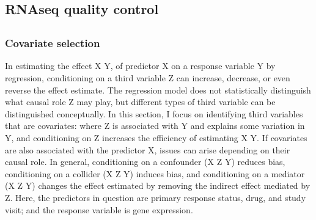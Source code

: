 \begin{outline}
%

\subsection{RNAseq quality control}

\subsection{}

\subsubsection{Covariate selection}

In estimating the effect X \textrightarrow Y, of predictor X on a response variable Y by regression, 
conditioning on a third variable Z can increase, decrease, or even reverse the effect estimate.
The regression model does not statistically distinguish what causal role Z may play,
but different types of third variable can be distinguished conceptually.
In this section, I focus on identifying third variables that are covariates:
where Z is associated with Y and explains some variation in Y,
and conditioning on Z increases the efficiency of estimating X \textrightarrow Y.
If covariates are also associated with the predictor X, issues can arise depending on their causal role.
In general,
conditioning on a confounder (X \textleftarrow Z \textrightarrow Y) reduces bias,
conditioning on a collider (X \textrightarrow Z \textleftarrow Y) induces bias,
and conditioning on a mediator (X \textrightarrow Z \textrightarrow Y) changes the effect estimated by removing the indirect effect mediated by Z.
Here, the predictors in question are primary response status, drug, and study visit; and the response variable is gene expression.


\end{outline}
